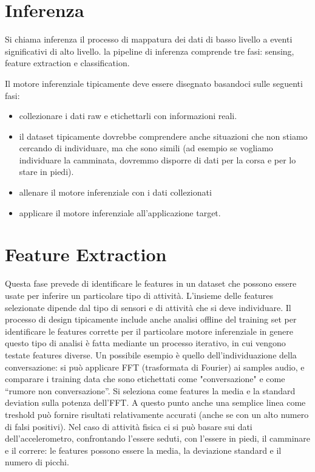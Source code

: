 \section{Inferenza}
Si chiama inferenza il processo di mappatura dei dati di basso livello a eventi 
significativi di alto livello.
la pipeline di inferenza comprende tre fasi: sensing, feature extraction e
classification.

Il motore inferenziale tipicamente deve essere disegnato basandoci sulle
seguenti fasi:
\begin{itemize}
\item collezionare i dati raw e etichettarli con informazioni reali.
\item il dataset tipicamente dovrebbe comprendere anche situazioni che non
stiamo cercando di individuare, ma che sono simili (ad esempio se vogliamo
individuare la camminata, dovremmo disporre di dati per la corsa e per lo stare
in piedi).
\item allenare il motore inferenziale con i dati collezionati
\item applicare il motore inferenziale all'applicazione target.
\end{itemize}

\section{Feature Extraction}
Questa fase prevede di identificare le features in un dataset che possono essere
usate per inferire un particolare tipo di attività.
L'insieme delle features selezionate dipende dal tipo di sensori e di attività
che si deve individuare. Il processo di design tipicamente include anche analisi
offline del training set per identificare le features corrette per il
particolare motore inferenziale in genere questo tipo di analisi è fatta
mediante un processo iterativo, in cui vengono testate features diverse.
Un possibile esempio è quello dell'individuazione della conversazione: si può
applicare FFT (trasformata di Fourier) ai samples audio, e comparare i training
data che sono etichettati come "conversazione" e come ``rumore non
conversazione''. Si seleziona come features la media e la standard deviation
sulla potenza dell'FFT. A questo punto anche una semplice linea come treshold
può fornire risultati relativamente accurati (anche se con un alto numero di
falsi positivi).
Nel caso di attività fisica ci si può basare sui dati dell'accelerometro,
confrontando l'essere seduti, con l'essere in piedi, il camminare e il correre:
le features possono essere la media, la deviazione standard e il numero di
picchi.

